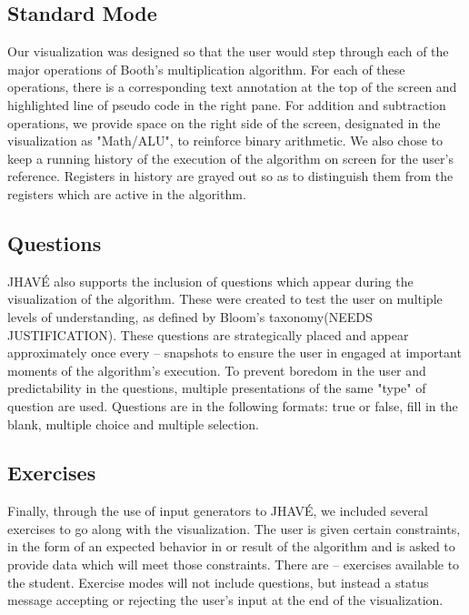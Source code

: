 \documentclass{acm_proc_article-sp}
\begin{document}
\subsection{Standard Mode}
Our visualization was designed so that the user would step through each of the major operations of Booth's multiplication algorithm.
For each of these operations, there is a corresponding text annotation at the top of the screen and highlighted line of pseudo code in the right pane.
For addition and subtraction operations, we provide space on the right side of the screen, designated in the visualization as "Math/ALU", to reinforce binary arithmetic.
We also chose to keep a running history of the execution of the algorithm on screen for the user's reference.
Registers in history are grayed out so as to distinguish them from the registers which are active in the algorithm.
\subsection{Questions}
JHAVÉ also supports the inclusion of questions which appear during the visualization of the algorithm.
These were created to test the user on multiple levels of understanding, as defined by Bloom's taxonomy(NEEDS JUSTIFICATION).
These questions are strategically placed and appear approximately once every -- snapshots to ensure the user in engaged at important moments of the algorithm's execution.
To prevent boredom in the user and predictability in the questions, multiple presentations of the same "type" of question are used.
Questions are in the following formats: true or false, fill in the blank, multiple choice and multiple selection.
\subsection{Exercises}%
Finally, through the use of input generators to JHAVÉ, we included several exercises to go along with the visualization.
The user is given certain constraints, in the form of an expected behavior in or result of the algorithm and is asked to provide data which will meet those constraints.
There are -- exercises available to the student.
Exercise modes will not include questions, but instead a status message accepting or rejecting the user's input at the end of the visualization.
\balancecolumns
\end{document}
